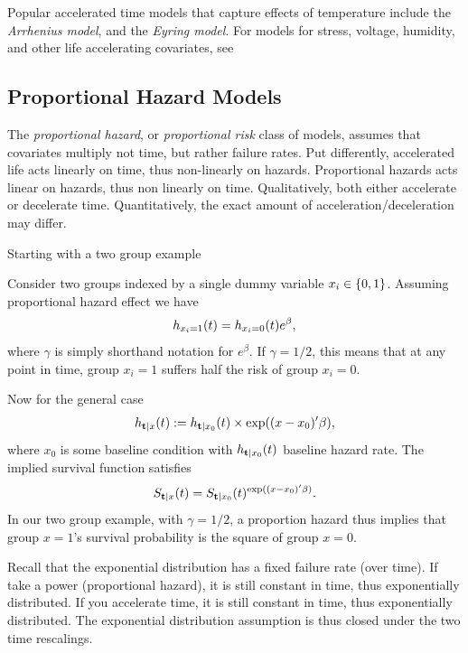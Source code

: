 \begin{extra}
Popular accelerated time models that capture effects of temperature include the \emph{Arrhenius model}, and the \emph{Eyring model}.
For models for stress, voltage, humidity, and other life accelerating covariates, see \cite[Sec.8.1.5]{natrella_nist/sematech_2010}
\end{extra}





\subsection{Proportional Hazard Models}
The \emph{proportional hazard}, or \emph{proportional risk} class of models, assumes that covariates multiply not time, but rather failure rates. 
Put differently, accelerated life acts linearly on time, thus non-linearly on hazards. Proportional hazards acts linear on hazards, thus non linearly on time. 
Qualitatively, both either accelerate or decelerate time. 
Quantitatively, the exact amount of acceleration/deceleration may differ. 

Starting with a two group example
\begin{example}
Consider two groups indexed by a single dummy variable $x_i \in \{ 0,1 \}$.
Assuming proportional hazard effect we have
$$
	h_{x_i=1} (t)=h_{x_i=0} (t) e^\beta, 
$$
where $\gamma$ is simply shorthand notation for $e^\beta$. 
If $\gamma=1/2$, this means that at any point in time, group $x_i=1$ suffers half the risk of group $x_i=0$.
\end{example}

Now for the general case
\begin{align}
	h_{\mathbf{t}|x} (t):=h_{\mathbf{t}|x_0} (t) \times \exp((x-x_0)'\beta) ,
\end{align}
where $x_0$ is some baseline condition with $h_{\mathbf{t}|x_0} (t)$ baseline hazard rate.
The implied survival function satisfies 
$$ S_{\mathbf{t}|x} (t)=S_{\mathbf{t}|x_0} (t)^{\exp((x-x_0)'\beta)}.$$
In our two group example, with $\gamma=1/2$, a proportion hazard thus implies that group $x=1$'s survival probability is the square of group $x=0$. 






\begin{example}
Recall that the exponential distribution has a fixed failure rate (over time). 
If take a power (proportional hazard), it is still constant in time, thus exponentially distributed. 
If you accelerate time, it is still constant in time, thus exponentially distributed. 
The exponential distribution assumption is thus closed under the two time rescalings.
\end{example}

